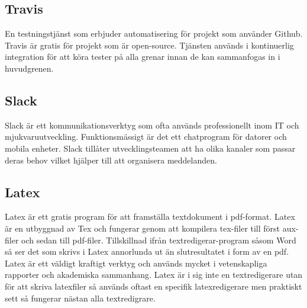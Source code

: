 \subsection*{Travis}
En testningstjänst som erbjuder automatisering för projekt som använder Github.\cite{Travis} Travis är gratis för projekt som är open-source. Tjänsten används i kontinuerlig integration för att köra tester på alla grenar innan de kan sammanfogas in i huvudgrenen.

\subsection*{Slack}
Slack är ett kommunikationsverktyg som ofta används professionellt inom IT och mjukvaruutveckling.\cite{Slack} Funktionsmässigt är det ett chatprogram för datorer och mobila enheter. Slack tillåter utvecklingsteamen att ha olika kanaler som passar deras behov vilket hjälper till att organisera meddelanden.

\subsection*{Latex}
Latex är ett gratis program för att framställa textdokument i pdf-format. Latex är en utbyggnad av Tex och fungerar genom att kompilera tex-filer till först aux-filer och sedan till pdf-filer. Tillskillnad ifrån textredigerar-program såsom Word så ser det som skrivs i Latex annorlunda ut än slutresultatet i form av en pdf. Latex är ett väldigt kraftigt verktyg och används mycket i vetenskapliga rapporter och akademiska sammanhang\cite{ctan}. Latex är i sig inte en textredigerare utan för att skriva latexfiler så används oftast en specifik latexredigerare men praktiskt sett så fungerar nästan alla textredigrare.